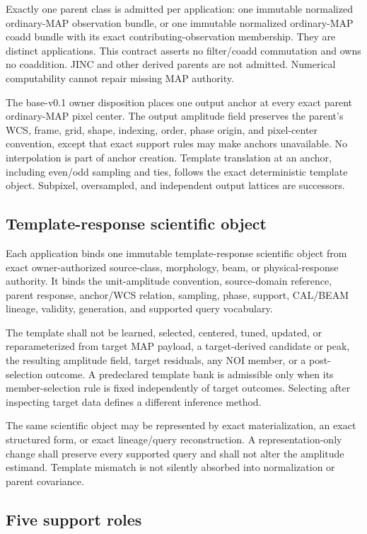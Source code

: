 Exactly one parent class is admitted per application: one immutable normalized
ordinary-MAP observation bundle, or one immutable normalized ordinary-MAP
coadd bundle with its exact contributing-observation membership. They are
distinct applications. This contract asserts no filter/coadd commutation and
owns no coaddition. JINC and other derived parents are not admitted. Numerical
computability cannot repair missing MAP authority.

The base-v0.1 owner disposition places one output anchor at every exact parent
ordinary-MAP pixel center. The output amplitude field preserves the parent's
WCS, frame, grid, shape, indexing, order, phase origin, and pixel-center
convention, except that exact support rules may make anchors unavailable. No
interpolation is part of anchor creation. Template translation at an anchor,
including even/odd sampling and ties, follows the exact deterministic template
object. Subpixel, oversampled, and independent output lattices are successors.

\subsection{Template-response scientific object}

Each application binds one immutable template-response scientific object from
exact owner-authorized source-class, morphology, beam, or physical-response
authority. It binds the unit-amplitude convention, source-domain reference,
parent response, anchor/WCS relation, sampling, phase, support, CAL/BEAM
lineage, validity, generation, and supported query vocabulary.

The template shall not be learned, selected, centered, tuned, updated, or
reparameterized from target MAP payload, a target-derived candidate or peak,
the resulting amplitude field, target residuals, any NOI member, or a
post-selection outcome. A predeclared template bank is admissible only when
its member-selection rule is fixed independently of target outcomes. Selecting
after inspecting target data defines a different inference method.

The same scientific object may be represented by exact materialization, an
exact structured form, or exact lineage/query reconstruction. A
representation-only change shall preserve every supported query and shall not
alter the amplitude estimand. Template mismatch is not silently absorbed into
normalization or parent covariance.

\subsection{Five support roles}
\label{sec:support-roles}

